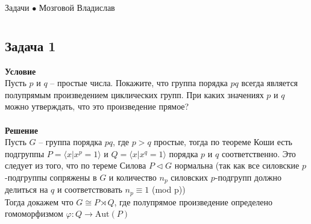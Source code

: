 \newpage
	{\large \hspace{3cm} \begin{center} Задачи $\bullet$ Мозговой Владислав \end{center} }
	\vspace{-1.5ex}
	\hrulefill
	
	\fontsize{12pt}{4.5mm}\selectfont
	\vspace{-3ex}
	\hrulefill
	\newline

	\section{}
		\subsection*{\textbf{Задача 1}}
		\textbf{Условие}\\
		Пусть $p$ и $q$ -- простые числа. Покажите, что группа порядка $pq$ всегда является полупрямым произведением циклических групп. При каких значениях $p$ и $q$ можно утверждать, что это произведение прямое?\\
		\\
		\textbf{Решение}\\
		Пусть $G$ -- группа порядка $pq$, где $p>q$ простые, тогда по теореме Коши есть подгруппы $P = \langle x | x^p = 1 \rangle$ и $Q = \langle x | x^q = 1 \rangle$ порядка $p$ и $q$ соответственно. Это следует из того, что по тереме Силова $P \triangleleft G$ нормальна (так как все силовские $p$-подгруппы сопряжены в $G$ и количество $n_p$ силовских $p$-подгрупп должно делиться на $q$ и соответствовать $n_p \equiv 1$ (mod p))\\
		Тогда докажем что $G \cong P \rtimes Q$, где полупрямое произведение определено гомоморфизмом $\varphi: Q \to \text{Aut}(P)$
